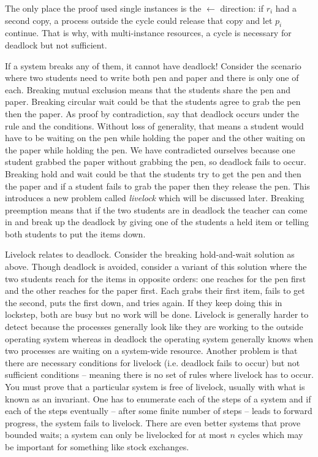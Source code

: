 The only place the proof used single instances is the $\leftarrow$ direction: if $r_i$ had a second copy, a process outside the cycle could release that copy and let $p_i$ continue.
That is why, with multi-instance resources, a cycle is necessary for deadlock but not sufficient.

If a system breaks any of them, it cannot have deadlock!
Consider the scenario where two students need to write both pen and paper and there is only one of each.
Breaking mutual exclusion means that the students share the pen and paper.
Breaking circular wait could be that the students agree to grab the pen then the paper.
As proof by contradiction, say that deadlock occurs under the rule and the conditions.
Without loss of generality, that means a student would have to be waiting on the pen while holding the paper and the other waiting on the paper while holding the pen.
We have contradicted ourselves because one student grabbed the paper without grabbing the pen, so deadlock fails to occur.
Breaking hold and wait could be that the students try to get the pen and then the paper and if a student fails to grab the paper then they release the pen.
This introduces a new problem called \textit{livelock} which will be discussed later.
Breaking preemption means that if the two students are in deadlock the teacher can come in and break up the deadlock by giving one of the students a held item or telling both students to put the items down.

Livelock relates to deadlock.
Consider the breaking hold-and-wait solution as above.
Though deadlock is avoided, consider a variant of this solution where the two students reach for the items in opposite orders: one reaches for the pen first and the other reaches for the paper first.
Each grabs their first item, fails to get the second, puts the first down, and tries again.
If they keep doing this in lockstep, both are busy but no work will be done.
Livelock is generally harder to detect because the processes generally look like they are working to the outside operating system whereas in deadlock the operating system generally knows when two processes are waiting on a system-wide resource.
Another problem is that there are necessary conditions for livelock (i.e. deadlock fails to occur) but not sufficient conditions -- meaning there is no set of rules where livelock has to occur.
You must prove that a particular system is free of livelock, usually with what is known as an invariant.
One has to enumerate each of the steps of a system and if each of the steps eventually -- after some finite number of steps -- leads to forward progress, the system fails to livelock.
There are even better systems that prove bounded waits; a system can only be livelocked for at most $n$ cycles which may be important for something like stock exchanges.

